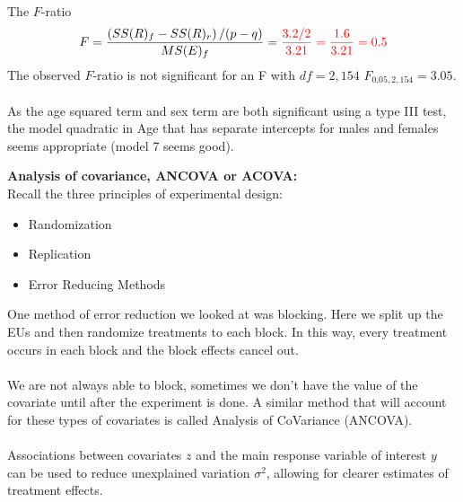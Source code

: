 The $F$-ratio 
$$F=\frac{\left(SS(R)_f - SS(R)_r\right)/(p-q)}{MS(E)_f} = \textcolor{red}{\frac{3.2/2}{3.21} = \frac{1.6}{3.21} = 0.5} $$
The observed $F$-ratio is not significant for an F with $df=2,154$ $F_{0.05,2,154}=3.05$.\\~\\

As the age squared term and sex term are both significant using a type III test, the model quadratic in Age that has separate intercepts for males and females seems appropriate (model 7 seems good).

\newpage

\Large\textbf{Analysis of covariance, ANCOVA or ACOVA:}\large\\
Recall the three principles of experimental design:
\begin{itemize}
\item Randomization
\item Replication
\item Error Reducing Methods
\end{itemize}

One method of error reduction we looked at was blocking.  Here we split up the EUs and then randomize treatments to each block.  In this way, every treatment occurs in each block and the block effects cancel out.\\~\\
We are not always able to block, sometimes we don't have the value of the covariate until after the experiment is done.  A similar method that will account for these types of covariates is called Analysis of CoVariance (ANCOVA).\\~\\
Associations between covariates $z$ and the main response variable of interest $y$ can be used to reduce unexplained variation $\sigma^2$, allowing for clearer estimates of treatment effects.\\~\\


